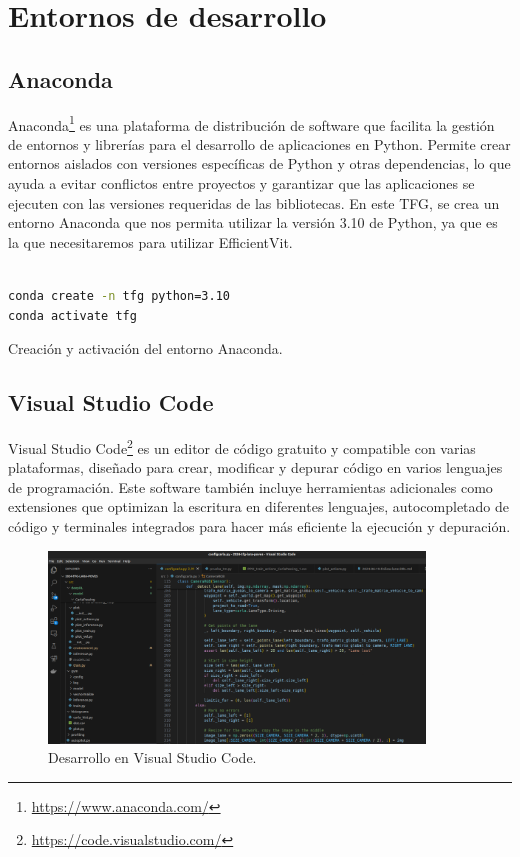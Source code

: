 \section{Entornos de desarrollo}
\label{sec:des}

\subsection{Anaconda}
\label{sec:conda}

Anaconda\footnote{\url{https://www.anaconda.com/}} es una plataforma de distribución de software que facilita la gestión de entornos y librerías para el desarrollo de aplicaciones en Python. Permite crear entornos aislados con versiones específicas de Python y otras dependencias, lo que ayuda a evitar conflictos entre proyectos y garantizar que las aplicaciones se ejecuten con las versiones requeridas de las bibliotecas. En este \ac{TFG}, se crea un entorno Anaconda que nos permita utilizar la versión 3.10 de Python, ya que es la que necesitaremos para utilizar EfficientVit.

\begin{code}[h]
\begin{lstlisting}[language=bash]

conda create -n tfg python=3.10
conda activate tfg

\end{lstlisting}
\caption[Creación del entorno Anaconda]{Creación y activación del entorno Anaconda.}
\label{cod:anaconda}
\end{code}

\subsection{Visual Studio Code}
\label{sec:vs_code}

Visual Studio Code\footnote{\url{https://code.visualstudio.com/}} es un editor de código gratuito y compatible con varias plataformas, diseñado para crear, modificar y depurar código en varios lenguajes de programación. Este software también incluye herramientas adicionales como extensiones que optimizan la escritura en diferentes lenguajes, autocompletado de código y terminales integrados para hacer más eficiente la ejecución y depuración.

\begin{figure}[ht]
  \begin{center}
    \includegraphics[width=10cm]{figs/Plataformas_Desarollo/visual_code.png}
  \end{center}
  \caption{Desarrollo en Visual Studio Code.}
  \label{foto_code}
\end{figure}

